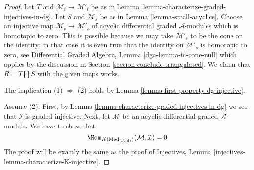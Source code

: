 \begin{proof}
Let $T$ and $\mathcal{M}_t \to \mathcal{M}'_t$ be as in
Lemma \ref{lemma-characterize-graded-injectives-in-dg}.
Let $S$ and $\mathcal{M}_s$ be as in
Lemma \ref{lemma-small-acyclics}.
Choose an injective map $\mathcal{M}_s \to \mathcal{M}'_s$
of acyclic differential graded $\mathcal{A}$-modules
which is homotopic to zero. This is possible because we
may take $\mathcal{M}'_s$ to be the cone on the identity;
in that case it is even true that the identity on
$\mathcal{M}'_s$ is homotopic to zero, see
Differential Graded Algebra, Lemma \ref{dga-lemma-id-cone-null} which
applies by the discussion in Section \ref{section-conclude-triangulated}.
We claim that $R = T \coprod S$ with the given maps works.

\medskip\noindent
The implication (1) $\Rightarrow$ (2) holds by
Lemma \ref{lemma-first-property-dg-injective}.

\medskip\noindent
Assume (2). First, by Lemma \ref{lemma-characterize-graded-injectives-in-dg}
we see that $\mathcal{I}$ is graded injective. Next, let
$\mathcal{M}$ be an acyclic differential graded $\mathcal{A}$-module.
We have to show that
$$
\Hom_{K(\text{Mod}_{(\mathcal{A}, \text{d})})}(\mathcal{M}, \mathcal{I}) = 0
$$
The proof will be exactly the same as the proof of
Injectives, Lemma \ref{injectives-lemma-characterize-K-injective}.


\end{proof}
